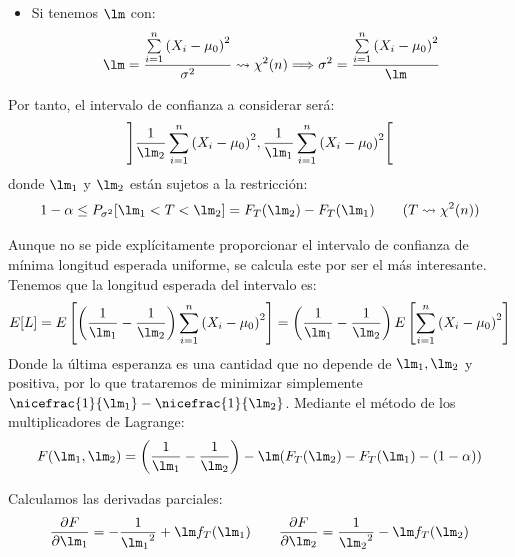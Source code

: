 \begin{ejercicio}
\begin{itemize}
        En efecto, es estrictamente decreciente respecto $\sigma^2$.
        \item Si tenemos $\lm$ con:
            \begin{equation*}
                \lm = \frac{\sum\limits_{i=1}^n{(X_i-\mu_0)}^{2}}{\sigma^2} \rightsquigarrow\chi^2(n) \Longrightarrow \sigma^2 = \frac{\sum\limits_{i=1}^n{(X_i-\mu_0)}^{2}}{\lm}
            \end{equation*}
    \end{itemize}
    
    Por tanto, el intervalo de confianza a considerar será:
    \begin{equation*}
        \left]\frac{1}{\lm_2}\sum\limits_{i=1}^n{(X_i-\mu_0)}^{2},\frac{1}{\lm_1}\sum\limits_{i=1}^n{(X_i-\mu_0)}^{2}\right[
    \end{equation*}
    donde $\lm_1$ y $\lm_2$ están sujetos a la restricción:
    \begin{equation*}
        1-\alpha \leq P_{\sigma^2}[\lm_1<T<\lm_2] = F_T(\lm_2) - F_T(\lm_1) \qquad (T\rightsquigarrow\chi^2(n))
    \end{equation*}

    Aunque no se pide explícitamente proporcionar el intervalo de confianza de mínima longitud esperada uniforme, se calcula este por ser el más interesante.
    Tenemos que la longitud esperada del intervalo es:
    \begin{equation*}
        E[L] = E\left[\left(\frac{1}{\lm_1}-\frac{1}{\lm_2}\right)\sum\limits_{i=1}^n{(X_i-\mu_0)}^{2}\right] = \left(\frac{1}{\lm_1}-\frac{1}{\lm_2}\right)E\left[\sum\limits_{i=1}^n{(X_i-\mu_0)}^{2}\right]
    \end{equation*}
    Donde la última esperanza es una cantidad que no depende de $\lm_1,\lm_2$ y positiva, por lo que trataremos de minimizar simplemente $\nicefrac{1}{\lm_1}-\nicefrac{1}{\lm_2}$. Mediante el método de los multiplicadores de Lagrange:
    \begin{equation*}
        F(\lm_1,\lm_2) = \left(\frac{1}{\lm_1}-\frac{1}{\lm_2}\right) - \lm(F_T(\lm_2)-F_T(\lm_1)-(1-\alpha))
    \end{equation*}

    Calculamos las derivadas parciales:
    \begin{equation*}
        \dfrac{\partial F}{\partial \lm_1} = -\frac{1}{{\lm_1}^2} + \lm f_T(\lm_1) \qquad \dfrac{\partial F}{\partial \lm_2} = \frac{1}{{\lm_2}^2} - \lm f_T(\lm_2)
    \end{equation*}


\end{ejercicio}
